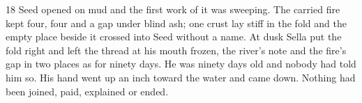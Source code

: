 \begin{CRchronicle}{18}
Seed opened on mud and the first work of it was sweeping. The carried fire kept four, four and a gap under blind ash; one crust lay stiff in the fold and the empty place beside it crossed into Seed without a name. At dusk Sella put the fold right and left the thread at his mouth frozen, the river’s note and the fire’s gap in two places as for ninety days. He was ninety days old and nobody had told him so. His hand went up an inch toward the water and came down. Nothing had been joined, paid, explained or ended.
\end{CRchronicle}
